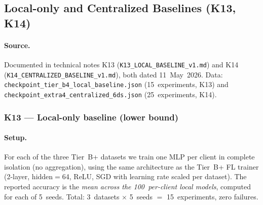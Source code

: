 \documentclass[conference]{IEEEtran}
\begin{document}
\subsection{Local-only and Centralized Baselines (K13, K14)}
\label{sec:tier_b_baselines}

\paragraph{Source.} Documented in technical notes K13 (\texttt{K13\_LOCAL\_BASELINE\_v1.md}) and K14 (\texttt{K14\_CENTRALIZED\_BASELINE\_v1.md}), both dated 11~May~2026. Data: \texttt{checkpoint\_tier\_b4\_local\_baseline.json} (15~experiments, K13) and \texttt{checkpoint\_extra4\_centralized\_6ds.json} (25~experiments, K14).

\subsubsection*{K13 --- Local-only baseline (lower bound)}

\paragraph{Setup.} For each of the three Tier~B+ datasets we train one MLP per client in complete isolation (no aggregation), using the same architecture as the Tier~B+ FL trainer (2-layer, hidden$=$64, ReLU, SGD with learning rate scaled per dataset). The reported accuracy is the \emph{mean across the 100~per-client local models}, computed for each of 5~seeds. Total: 3~datasets $\times$ 5~seeds $=$ 15~experiments, zero failures.
\end{document}
